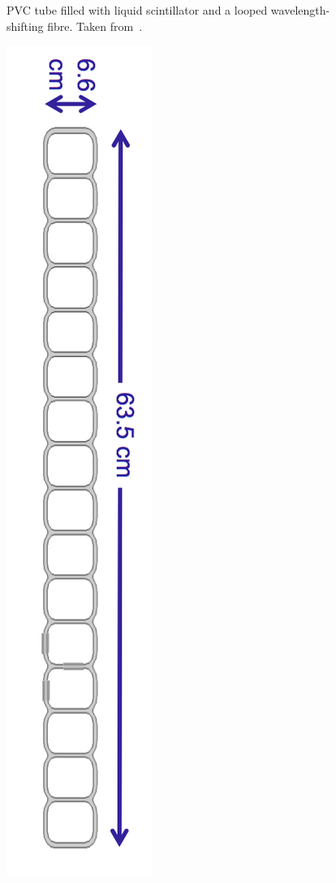 \begin{figure}
\begin{minipage}{.45\textwidth}
{      PVC tube filled with liquid scintillator and a looped
      wavelength-shifting fibre. 
      Taken from~\cite{TDR}.
    }
    \label{fig:cell}
  \end{minipage}%
  \hfill
  \begin{minipage}{.45\textwidth}
    \centering
    \includegraphics[height=0.4\textheight]{../../img/baird/det/extru_cross_section.png}
    \label{fig:extrusion}
  \end{minipage}
\end{figure}




